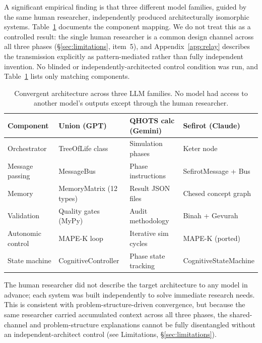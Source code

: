 \documentclass[11pt]{article}
\theoremstyle{definition}
\theoremstyle{remark}
\begin{document}
A significant empirical finding is that three different model families,
guided by the same human researcher, independently produced architecturally
isomorphic systems.  Table~\ref{tab:convergence} documents the component
mapping.  We do not treat this as a controlled result: the single human
researcher is a common design channel across all three phases
(\S\ref{sec:limitations}, item~5), and Appendix~\ref{app:relay} describes the
transmission explicitly as pattern-mediated rather than fully independent
invention.  No blinded or independently-architected control condition was
run, and Table~\ref{tab:convergence} lists only matching components.

\begin{table}[ht]
\centering
\caption{Convergent architecture across three LLM families.  No model had access
  to another model's outputs except through the human researcher.}
\label{tab:convergence}
\begin{tabular}{@{}llll@{}}
\toprule
\textbf{Component} & \textbf{Union (GPT)} & \textbf{QHOTS calc (Gemini)}
  & \textbf{Sefirot (Claude)} \\
\midrule
Orchestrator     & TreeOfLife class      & Simulation phases     & Keter node \\
Message passing  & MessageBus            & Phase instructions    & SefirotMessage + Bus \\
Memory           & MemoryMatrix (12 types) & Result JSON files   & Chesed concept graph \\
Validation       & Quality gates (MyPy)  & Audit methodology     & Binah + Gevurah \\
Autonomic control & MAPE-K loop          & Iterative sim cycles  & MAPE-K (ported) \\
State machine    & CognitiveController   & Phase state tracking  & CognitiveStateMachine \\
\bottomrule
\end{tabular}
\end{table}

The human researcher did not describe the target architecture to any model in
advance; each system was built independently to solve immediate research
needs.  This is consistent with problem-structure-driven convergence, but
because the same researcher carried accumulated context across all three
phases, the shared-channel and problem-structure explanations cannot be fully
disentangled without an independent-architect control (see
Limitations, \S\ref{sec:limitations}).
\end{document}
